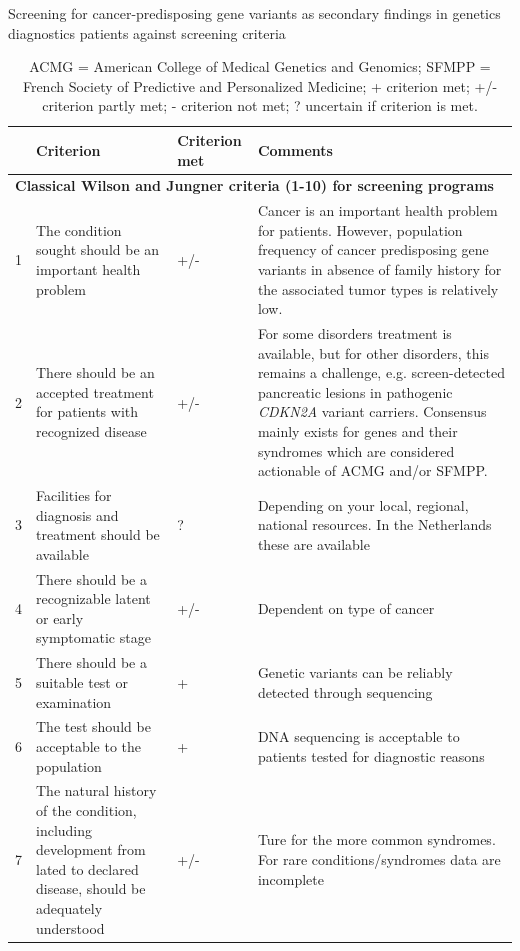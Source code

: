 \begin{table}
	\footnotesize
	\caption[Screening for secondary findings against screening criteria]{\label{table:summary}Screening for cancer-predisposing gene variants as secondary findings in genetics diagnostics patients against screening criteria}
	\begin{tabular}{ p{0.5cm} p{5.5cm} p{2cm} p{7cm} }
		 & \footnotesize{\textbf{Criterion}} & \footnotesize{\textbf{Criterion met}} & \footnotesize{\textbf{Comments}} \\
		\hline
		
		\multicolumn{4}{|l|}{\textbf{Classical Wilson and Jungner criteria (1-10) for screening programs \cite{Andermann_2008}}} \\
		
		\hline
		1 & The condition sought should be an important health problem & +/- & Cancer is an important health problem for patients. However, population frequency of cancer predisposing gene variants in absence of family history for the associated tumor types is relatively low. \\
		2 & There should be an accepted treatment for patients with recognized disease & +/- & For some disorders treatment is available, but for other disorders, this remains a challenge, e.g. screen-detected pancreatic lesions in pathogenic \textsl{CDKN2A} variant carriers. Consensus mainly exists for genes and their syndromes which are considered actionable of ACMG and/or SFMPP. \\
		3 & Facilities for diagnosis and treatment should be available & ? & Depending on your local, regional, national resources. In the Netherlands these are available \\
		4 & There should be a recognizable latent or early symptomatic stage & +/- & Dependent on type of cancer \\
		5 & There should be a suitable test or examination& + & Genetic variants can be reliably detected through sequencing \\
		6 & The test should be acceptable to the population & + & DNA sequencing is acceptable to patients tested for diagnostic reasons \\
		7 & The natural history of the condition, including development from lated to declared disease, should be adequately understood & +/- & Ture for the more common syndromes. For rare conditions/syndromes data are incomplete \\
		\hline
	\end{tabular}
	\caption*{ACMG = American College of Medical Genetics and Genomics; SFMPP = French Society of Predictive and Personalized Medicine; + criterion met; +/- criterion partly met; - criterion not met; ? uncertain if criterion is met.}
\end{table}

